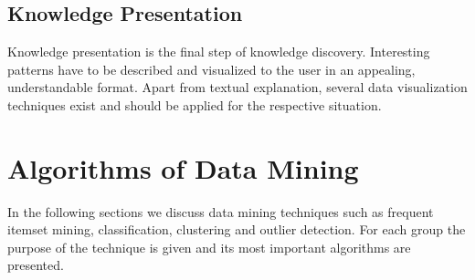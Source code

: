 \subsection{Knowledge Presentation}

Knowledge presentation is the final step of knowledge discovery. Interesting patterns have to be described and visualized to the user in an appealing, understandable format. Apart from textual explanation, several data visualization techniques exist and should be applied for the respective situation.


\section{Algorithms of Data Mining}\label{section:datamining}
In the following sections we discuss data mining techniques such as frequent itemset mining, classification, clustering and outlier detection.
For each group the purpose of the technique is given and its most important algorithms are presented.

